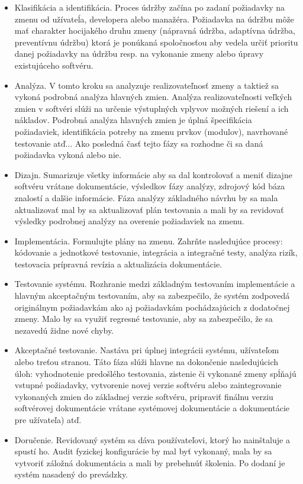 \documentclass[10pt,twoside,slovak,a4paper]{article}
\begin{document}
\begin{itemize}
    \item Klasifikácia a identifikácia. Proces údržby začína po zadaní požiadavky na zmenu od užívateĺa, developera alebo manažéra. Požiadavka na údržbu môže mať charakter hocijakého druhu zmeny (nápravná údržba, adaptívna údržba, preventívnu údržbu) ktorá je ponúkaná spoločnosťou aby vedela určiť prioritu danej požiadavky na údržbu resp. na vykonanie zmeny alebo úpravy existujúceho softvéru.\cite{6116869}
    \item Analýza. V tomto kroku sa analyzuje realizovateľnosť zmeny a taktiež sa vykoná podrobná analýza hlavných zmien. Analýza realizovateľnosti veľkých zmien v softvéri slúži na určenie výstuplných vplyvov možných riešení a ich nákladov. Podrobná analýza hlavných zmien je úplná špecifikácia požiadaviek, identifikácia potreby na zmenu prvkov (modulov), navrhované testovanie atď... Ako posledná časť tejto fázy sa rozhodne či sa daná požiadavka vykoná alebo nie.\cite{6116869}
    \item Dizajn. Sumarizuje všetky informácie aby sa dal kontrolovať a meniť dizajne softvéru vrátane dokumentácie, výsledkov fázy analýzy, zdrojový kód báza znalostí a dalšie informácie. Fáza analýzy základného návrhu by sa mala aktualizovať mal by sa  aktualizovať plán testovania a mali by sa revidovať výsledky podrobnej analýzy na overenie požiadaviek na zmenu.\cite{6116869}
    \item Implementácia. Formulujte plány na zmenu. Zahrňte nasledujúce procesy: kódovanie a
    jednotkové testovanie, integrácia a integračné testy, analýza rizík, testovacia  prípravná revízia a aktualizácia dokumentácie.\cite{6116869}
    \item Testovanie systému. Rozhranie medzi základným testovaním implementácie a hlavným akceptačným testovaním, aby sa zabezpečilo, že systém zodpovedá originálnym požiadavkám ako aj požiadavkám pochádzajúcich z  dodatočnej zmeny. Malo by sa využiť regresné testovanie, aby sa zabezpečilo, že sa nezavedú židne nové chyby.\cite{6116869}
    \item Akceptačné testovanie. Nastáva pri úplnej integrácii systému, užívateľom alebo treťou stranou. Táto fáza slúži hlavne na dokončenie nasledujúcich úloh: vyhodnotenie predošlého testovania, zistenie či vykonané zmeny spĺňajú vstupné požiadavky, vytvorenie novej verzie softvéru alebo zaintegrovanie vykonaných zmien do základnej verzie softvéru, pripraviť finálnu verziu softvérovej dokumentácie vrátane systémovej dokumentácie a dokumentácie pre užívateľa) atď.\cite{6116869}
    \item Doručenie. Revidovaný systém sa dáva používateľovi, ktorý ho nainštaluje a spustí ho. Audit fyzickej konfigurácie by mal byť vykonaný, mala by sa vytvoriť záložná dokumentácia a mali by prebehnúť školenia. Po dodaní je systém nasadený do prevádzky.\cite{6116869}
\end{itemize}
\end{document}
